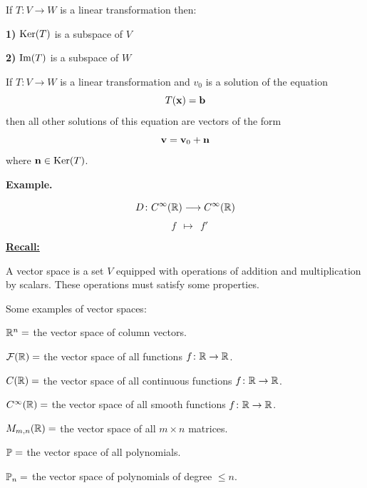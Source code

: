 {\newpage

\begin{cbox}[Proposition]
If  $T\colon V \to W$ is a linear transformation then:

\benu
\item[{\bf 1)}]  $\text{Ker}(T)$ is a subspace of $V$ \\[-4mm]
\item[{\bf 2)}]  $\text{Im}(T)$ is a subspace of $W$
\eenu
\end{cbox}

\vskip 50mm


\begin{cbox}[Theorem]
If  $T\colon V \to W$ is a linear transformation and $v_{0}$ is a solution of the equation 
$$T({\bf x}) = {\bf b}$$
then all other solutions of this equation are vectors of the form 
$${\bf v} = {\bf v}_{0} + {\bf n}$$
where ${\bf n} \in \text{Ker}(T)$. 
\end{cbox}


\newpage

{\bf Example.}

$$D \colon C^{\infty}({\mathbb R}) \longrightarrow C^{\infty}({\mathbb R})$$
$$\ \ \ \ f \ \ \longmapsto \ \ f'$$






\underline{\bf Recall:}

\vskip 5mm

{\textbullet} A vector space is a set $V$ equipped with operations of addition and multiplication by scalars. 
These operations must satisfy some properties. 

\vskip 5mm

{\textbullet} Some examples of vector spaces:

\vskip 5mm

\benu
\item[\bf 1)] ${\mathbb R}^{n} = $  the vector space of column vectors.\\[-2mm]
\item[\bf 2)] ${\mathcal F}({\mathbb R}) = $ the vector space of all functions $f\colon {\mathbb R}\to {\mathbb R}$. \\[-2mm]
\item[\bf 3)] $C({\mathbb R}) = $ the vector space of all continuous functions $f\colon {\mathbb R}\to {\mathbb R}$. \\[-2mm]
\item[\bf 4)] $C^{\infty}({\mathbb R}) = $ the vector space of all smooth functions $f\colon {\mathbb R}\to {\mathbb R}$. \\[-2mm]
\item[\bf 5)] $M_{m, n}({\mathbb R}) = $ the vector space of all $m\times n$ matrices. \\[-2mm]
\item[\bf 6)] ${\mathbb P} = $ the vector space of all polynomials.   \\[-2mm]
\item[\bf 7)] ${\mathbb P}_{n} = $ the vector space of polynomials of degree $\leq n$.  
\eenu


}
